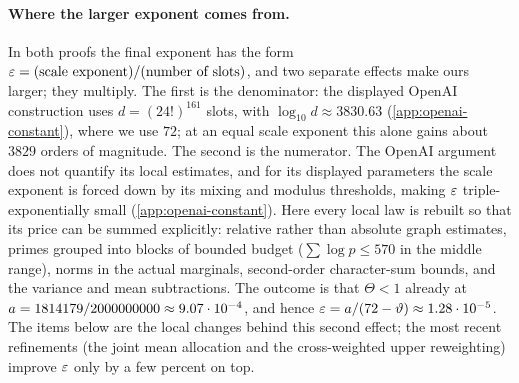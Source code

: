\paragraph{Where the larger exponent comes from.}
In both proofs the final exponent has the form
$\varepsilon=(\text{scale exponent})/(\text{number of slots})$, and two
separate effects make ours larger; they multiply. The first is the
denominator: the displayed OpenAI construction uses
$d=(24!)^{161}$ slots, with $\log_{10}d\approx3830.63$
(\cref{app:openai-constant}), where we use $72$; at an equal scale
exponent this alone gains about $3829$ orders of magnitude. The
second is the numerator. The OpenAI argument does not quantify its
local estimates, and for its displayed parameters the scale
exponent is forced down by its mixing and modulus thresholds,
making $\varepsilon$ triple-exponentially small
(\cref{app:openai-constant}). Here every local law is rebuilt so
that its price can be summed explicitly: relative rather than
absolute graph estimates, primes grouped into blocks of bounded
budget ($\sum\log p\le570$ in the middle range), norms in the
actual marginals, second-order character-sum bounds, and the
variance and mean subtractions. The outcome is that $\Theta<1$
already at $a=1814179/2000000000\approx9.07\cdot10^{-4}$, and hence
$\varepsilon=a/(72-\vartheta)\approx1.28\cdot10^{-5}$. The items below
are the local changes behind this second effect; the most recent
refinements (the joint mean allocation and the cross-weighted
upper reweighting) improve $\varepsilon$ only by a few percent on top.

